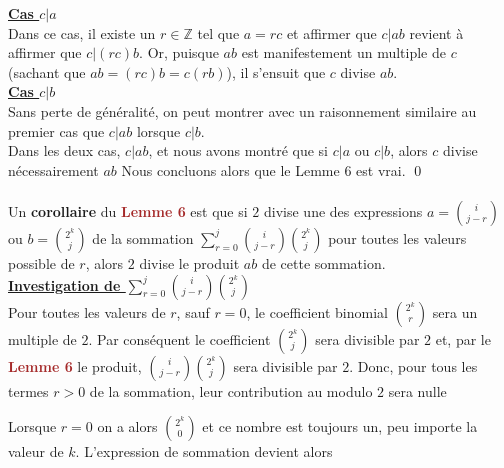 \documentclass[16pt]{report}
\begin{document}
\begin{multicols*}{2}
\begin{Preuve*}{}{}
            \underline{\textbf{Cas  $c | a $}} \vspace{1em} \\ 
            Dans ce cas, il existe un $r \in \mathbb{Z}$ tel que $a = rc$ et affirmer que 
            $c | ab$ revient à affirmer que $c |(rc)b$. Or, puisque $ab$ est manifestement 
            un multiple de $c$ (sachant que $ab = (rc)b = c(rb)$), il s'ensuit que 
            $c$ divise $ab$. 
            \vspace{1em} \\
            \underline{\textbf{Cas  $c | b $}} \vspace{1em} \\ 
            Sans perte de généralité, on peut montrer avec un raisonnement similaire au  
            premier cas que $c | ab$ lorsque $c|b$. 
            \vspace{1em} \\ 
            Dans les deux cas, $c|ab$, et nous avons montré que si $c|a$ ou $c|b$, alors 
            $c$ divise nécessairement $ab$ Nous concluons alors que le Lemme 6 est vrai. \qed
            
            \paragraph{}
            Un \textbf{corollaire} du \textbf{\textcolor{brown}{Lemme 6}} est que si $2$ divise 
            une des expressions $a = {i \choose j - r}$ ou $b = {2^k \choose j}$ de 
            la sommation $\sum_{r=0}^{j} {i \choose j - r} {2^k \choose j}$ pour 
            toutes les valeurs possible de $r$, 
            alors $2$ divise le produit $ab$ de cette sommation. 
            \vspace{1em} \\ 
            \underline{\textbf{Investigation de $\sum_{r=0}^{j} {i \choose j - r} {2^k \choose j}$}}
            \vspace{1em} \\ 
            Pour toutes les valeurs de $r$, sauf $r = 0$, le coefficient binomial ${2^k \choose r}$ 
            sera un multiple de $2$. Par conséquent le coefficient
            ${2^k \choose j}$ sera divisible par $2$ et, 
            par le \textbf{\textcolor{brown}{Lemme 6}} le produit, ${i \choose j -r}{2^k \choose j}$
            sera divisible par $2$. Donc, pour tous les termes $r > 0$ de la sommation, 
            leur contribution au modulo $2$ sera nulle 


            Lorsque $r = 0$ on a alors ${2^k \choose 0}$ et ce nombre est toujours un, peu importe la 
            valeur de $k$. L'expression de sommation devient alors 


\end{Preuve*}
\end{multicols*}
\end{document}
